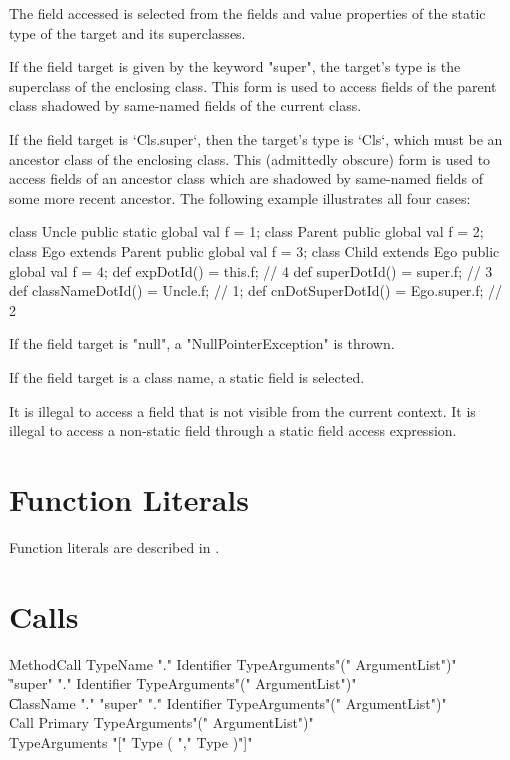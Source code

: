 The field accessed is selected from the fields and value properties
of the static type of the target and its superclasses.

If the field target is given by the keyword \xcd"super", the target's type is
the superclass of the enclosing class.  This form is used to access fields of
the parent class shadowed by same-named fields of the current class.

If the field target is \xcd`Cls.super`, then the target's type is \xcd`Cls`,
which must be an ancestor class of the enclosing class.  This (admittedly
obscure) form is used to access fields of an ancestor class which are shadowed
by same-named fields of some more recent ancestor.  The following example
illustrates all four cases:

\begin{xten}
class Uncle {
  public static global val f = 1;
}
class Parent {
  public global val f = 2;
}
class Ego extends Parent {
  public global val f = 3;
  class Child extends Ego {
     public global val f = 4;
     def expDotId() = this.f; // 4
     def superDotId() = super.f; // 3
     def classNameDotId() = Uncle.f; // 1;
     def cnDotSuperDotId() = Ego.super.f; // 2
  }
}
\end{xten}
%


If the field target is \xcd"null", a \xcd"NullPointerException"
is thrown.

If the field target is a class name, a static field is selected.

It is illegal to access  a field that is not visible from
the current context.
It is illegal to access a non-static field
through a static field access expression.

\section{Function Literals}
Function literals are described in .

\section{Calls}
\label{Call}
\label{MethodInvocation}
\label{MethodInvocationSubstitution}

\begin{grammar}
MethodCall \: TypeName \xcd"." Identifier TypeArguments\opt \xcd"(" ArgumentList\opt \xcd")" \\
           \| \xcd"super" \xcd"." Identifier TypeArguments\opt \xcd"(" ArgumentList\opt \xcd")" \\
           \| ClassName \xcd"." \xcd"super" \xcd"." Identifier TypeArguments\opt \xcd"(" ArgumentList\opt \xcd")" \\
Call \: Primary TypeArguments\opt \xcd"(" ArgumentList\opt \xcd")" \\
TypeArguments \: \xcd"[" Type ( \xcd"," Type )\star \xcd"]" \\
\end{grammar}

